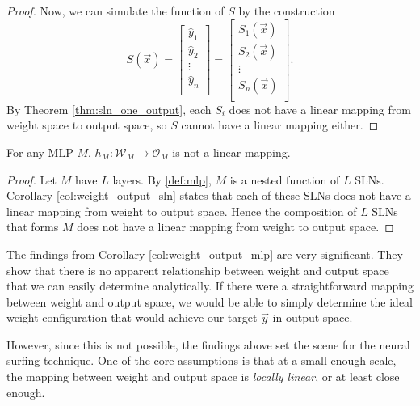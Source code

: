 \begin{proof}
    Now, we can simulate the function of $S$ by the construction
    \begin{equation*}
        S(\vec{x})
        = \begin{bmatrix}
            \hat{y}_1 \\
            \hat{y}_2 \\
            \vdots \\
            \hat{y}_n \\
        \end{bmatrix}
        = \begin{bmatrix}
            S_1(\vec{x}) \\
            S_2(\vec{x}) \\
            \vdots \\
            S_n(\vec{x}) \\
        \end{bmatrix}.
    \end{equation*}
    By Theorem \ref{thm:sln_one_output}, each $S_i$ does not have a linear mapping from weight space to output space, so $S$ cannot have a linear mapping either.
\end{proof}

\begin{corollary}
    \label{col:weight_output_mlp}
    For any MLP $M$, $h_M: \mathcal{W}_M \rightarrow \mathcal{O}_M$ is not a linear mapping.
\end{corollary}
\begin{proof}
    Let $M$ have $L$ layers.
    By \ref{def:mlp}, $M$ is a nested function of $L$ SLNs. 
    Corollary \ref{col:weight_output_sln} states that each of these SLNs does not have a linear mapping from weight to output space.
    Hence the composition of $L$ SLNs that forms $M$ does not have a linear mapping from weight to output space.
\end{proof}

\begin{remark}
    The findings from Corollary \ref{col:weight_output_mlp} are very significant.
    They show that there is no apparent relationship between weight and output space that we can easily determine analytically. 
    If there were a straightforward mapping between weight and output space, we would be able to simply determine the ideal weight configuration that would achieve our target $\vec{y}$ in output space. 
    
    However, since this is not possible, the findings above set the scene for the neural surfing technique. 
    One of the core assumptions is that at a small enough scale, the mapping between weight and output space is \textit{locally linear}, or at least close enough.
\end{remark}

